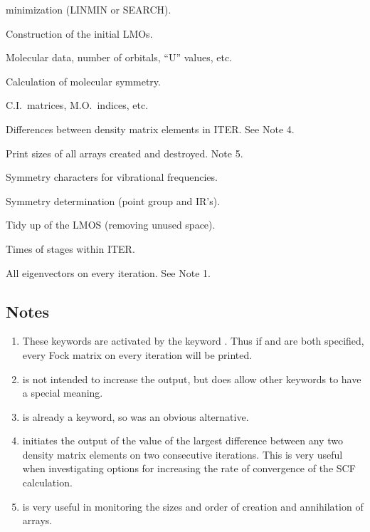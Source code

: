 \begin{description}
minimization (LINMIN or SEARCH).
\item[\comp{MAKVEC}] Construction of the initial LMOs.
\item[\comp{MOLDAT}] Molecular data, number of orbitals, ``U'' values, etc.
\item[\comp{MOLSYM}] Calculation of molecular symmetry.
\item[\comp{MECI}] C.I.\ matrices, M.O.\ indices, etc.
\item[\comp{PL}] Differences between density matrix elements in ITER. See Note 4.
\item[\comp{SIZES}] Print sizes of all arrays created and destroyed.  Note 5.
\item[\comp{SYMOIR}] Symmetry characters for vibrational frequencies.
\item[\comp{SYMTRZ}] Symmetry determination (point group and IR's).
\item[\comp{TIDY}] Tidy up of the LMOS (removing unused space).
\item[\comp{TIMES}] Times of stages within ITER.
\item[\comp{VECTORS}] All eigenvectors on every iteration. See Note 1.
\end{description}

\subsection*{Notes}
\begin{enumerate}
\item These keywords are activated by the  keyword  .   Thus  if
  and   are both specified, every Fock matrix on every
iteration will be printed.
\item {} is not intended to increase the output,  but  does  allow
other keywords to have a special meaning.
\item {} is already  a  keyword,  so    was  an 
obvious alternative.
\item {} initiates the output of the value of the largest  difference
between  any  two  density  matrix  elements on two consecutive iterations. 
This is very useful when investigating options for increasing the rate of
convergence of the SCF calculation.
\item {} is very useful in monitoring the sizes and order of creation
and annihilation of arrays.
\end{enumerate}

